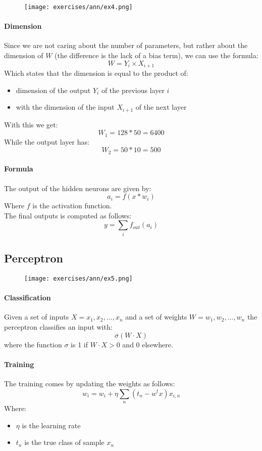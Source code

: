 \begin{figure}[H]
    \centering
    \texttt{[image: exercises/ann/ex4.png]}
\end{figure}

\paragraph{Dimension}
Since we are not caring about the number of parameters, but rather about the dimension of $W$ (the difference is the lack of a bias term), we can use the formula:
$$W=Y_i\times X_{i+1}$$
Which states that the dimension is equal to the product of:
\begin{itemize}
\item dimension  of the output $Y_i$ of the previous layer $i$
\item with the dimension of the input  $X_{i+1} $ of the next layer
\end{itemize}  
With this we get:
$$W_1=128*50 =6400$$
While the output layer has:
$$W_2=50*10 =500$$

\paragraph{Formula}
The output of the hidden neurons are given by:
$$a_i=f(x*w_i)$$
Where $f$ is the activation function.\\
The final outputs is computed as follows:
$$y=\sum_i f_{out}(a_i)$$

\subsection{Perceptron}

\begin{figure}[H]
    \centering
    \texttt{[image: exercises/ann/ex5.png]}
\end{figure}

\paragraph{Classification}
Given a set of inputs $X=x_1,x_2,\dots, x_n$ and a set of weights $W=w_1,w_2,\dots,w_n$ the perceptron classifies an input with:
$$\sigma(W\cdot X)$$
where the function $\sigma$ is 1 if $W\cdot X >0$ and 0 elsewhere.

\paragraph{Training}
The training comes by updating the weights as follows:
$$w_i=w_i+\eta \sum_n (t_n-w^tx)x_{i,n}$$
Where:
\begin{itemize}
\item $\eta$ is the learning rate
\item $t_n$ is the true class of sample $x_n$
\end{itemize}

